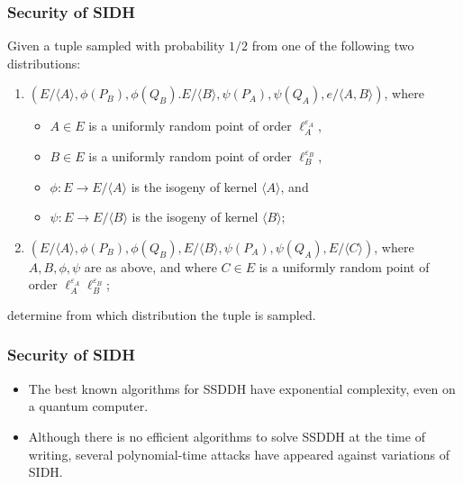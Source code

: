 \documentclass{beamer}
\begin{document}
\begin{frame}
\frametitle{Security of SIDH}
	\begin{definition}
		
		Given a tuple sampled with probability  $1/2$ from one of the following two distributions:
		\begin{enumerate}
			\item $(E/\langle A \rangle, \phi(P_B), \phi(Q_B). E/\langle B \rangle, \psi(P_A), \psi(Q_A), e/\langle A, B \rangle)$, where
			
			\begin{itemize}
				\item $A \in E$ is a uniformly random point of order $\ell_A^{\varepsilon_A}$,
				
				\item $B \in E$ is a uniformly random point of order $\ell_B^{\varepsilon_B}$,
				
				\item $\phi: E \to E/\langle A \rangle$ is the isogeny of kernel $\langle A \rangle$, and
				
				\item $\psi: E \to E/\langle B \rangle$ is the isogeny of kernel $\langle B \rangle$;
			\end{itemize}
			
			\item $(E/\langle A \rangle, \phi(P_B), \phi(Q_B), E/\langle	B \rangle, \psi(P_A), \psi(Q_A), E/\langle C \rangle)$, where $A, B, \phi, \psi$ are as above, and where $C \in E$ is a uniformly random point of order $\ell_A^{\varepsilon_A}\ell_B^{\varepsilon_B}$;
		\end{enumerate}
		determine from which distribution the tuple is sampled.
	\end{definition}
\end{frame}

\begin{frame}
\frametitle{Security of SIDH}
	\begin{itemize}
		\item The best known algorithms for SSDDH have \alert{exponential complexity}, even on a quantum computer.
		
		\item Although there is no efficient algorithms to solve SSDDH at the time of writing, several polynomial-time attacks have appeared  against variations of SIDH.
	\end{itemize}
\end{frame}
\end{document}
